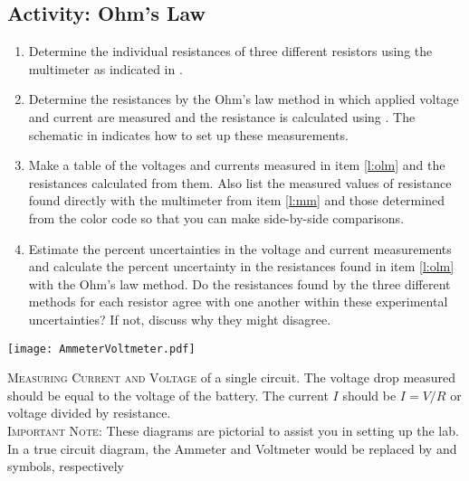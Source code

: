 \subsection{Activity: Ohm's Law} \label{s:ohmlaw}
\begin{enumerate}
	\item \label{l:mm} Determine the individual resistances of three different resistors using the multimeter as indicated in .
	
	\item \label{l:olm}Determine the resistances by the Ohm's law method in which applied voltage and current are measured and the resistance is calculated using .  The schematic in  indicates how to set up these measurements.

	\item Make a table of the voltages and currents measured in item \ref{l:olm} and the resistances calculated from them.  Also list the measured values of resistance found directly with the multimeter from item \ref{l:mm} and those determined from the color code so that you can make side-by-side comparisons.

	\item Estimate the percent uncertainties in the voltage and current measurements and calculate the percent uncertainty in the resistances found in item \ref{l:olm} with the Ohm's law method.  Do the resistances found by the three different methods for each resistor agree with one another within these experimental uncertainties? If not, discuss why they might disagree.
	
\end{enumerate}
\begin{marginfigure}
	\texttt{[image: AmmeterVoltmeter.pdf]} 
	\caption[Measuring Current and Voltage]{\textsc{Measuring Current and Voltage} of a single circuit.  The voltage drop measured should be equal to the voltage of the battery.  The current $I$ should be $I=V/R$ or voltage divided by resistance.\\[1em]\textsc{Important Note:} These diagrams are pictorial to assist you in setting up the lab.  In a true circuit diagram, the Ammeter and Voltmeter would be replaced by  and  symbols, respectively}
	\label{f:mamblock}
\end{marginfigure}


